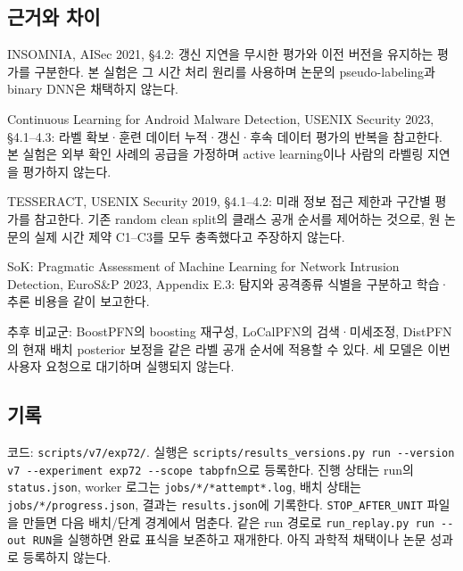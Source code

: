 \subsection{근거와 차이}
\par\noindent \textbullet\enspace INSOMNIA, AISec 2021, §4.2: 갱신 지연을 무시한 평가와 이전 버전을 유지하는 평가를 구분한다. 본 실험은 그 시간 처리 원리를 사용하며 논문의 pseudo-labeling과 binary DNN은 채택하지 않는다.


\par\noindent \textbullet\enspace Continuous Learning for Android Malware Detection, USENIX Security 2023, §4.1–4.3: 라벨 확보·훈련 데이터 누적·갱신·후속 데이터 평가의 반복을 참고한다. 본 실험은 외부 확인 사례의 공급을 가정하며 active learning이나 사람의 라벨링 지연을 평가하지 않는다.


\par\noindent \textbullet\enspace TESSERACT, USENIX Security 2019, §4.1–4.2: 미래 정보 접근 제한과 구간별 평가를 참고한다. 기존 random clean split의 클래스 공개 순서를 제어하는 것으로, 원 논문의 실제 시간 제약 C1–C3를 모두 충족했다고 주장하지 않는다.


\par\noindent \textbullet\enspace SoK: Pragmatic Assessment of Machine Learning for Network Intrusion Detection, EuroS\&P 2023, Appendix E.3: 탐지와 공격종류 식별을 구분하고 학습·추론 비용을 같이 보고한다.


\par\noindent \textbullet\enspace 추후 비교군: BoostPFN의 boosting 재구성, LoCalPFN의 검색·미세조정, DistPFN의 현재 배치 posterior 보정을 같은 라벨 공개 순서에 적용할 수 있다. 세 모델은 이번 사용자 요청으로 대기하며 실행되지 않는다.


\subsection{기록}
코드: \texttt{scripts/\allowbreak{}\allowbreak{}v7/\allowbreak{}\allowbreak{}exp72\allowbreak{}/\allowbreak{}\allowbreak{}}. 실행은 \texttt{scripts/\allowbreak{}\allowbreak{}results\_\allowbreak{}\allowbreak{}versions\allowbreak{}.\allowbreak{}py run \allowbreak{}-\allowbreak{}-\allowbreak{}versio\allowbreak{}n v7 -\allowbreak{}-\allowbreak{}e\allowbreak{}xperimen\allowbreak{}t exp72 \allowbreak{}-\allowbreak{}-\allowbreak{}scope \allowbreak{}tabpfn}으로 등록한다. 진행 상태는 run의 \texttt{status.\allowbreak{}j\allowbreak{}son}, worker 로그는 \texttt{jobs/\allowbreak{}\allowbreak{}*/\allowbreak{}\allowbreak{}*\allowbreak{}attempt*\allowbreak{}.\allowbreak{}log}, 배치 상태는 \texttt{jobs/\allowbreak{}\allowbreak{}*/\allowbreak{}\allowbreak{}p\allowbreak{}rogress.\allowbreak{}json}, 결과는 \texttt{results.\allowbreak{}json}에 기록한다. \texttt{STOP\_\allowbreak{}\allowbreak{}AFT\allowbreak{}ER\_\allowbreak{}\allowbreak{}UNIT} 파일을 만들면 다음 배치/\allowbreak{}단계 경계에서 멈춘다. 같은 run 경로로 \texttt{run\_\allowbreak{}\allowbreak{}repl\allowbreak{}ay.\allowbreak{}py ru\allowbreak{}n -\allowbreak{}-\allowbreak{}out \allowbreak{}RUN}을 실행하면 완료 표식을 보존하고 재개한다. 아직 과학적 채택이나 논문 성과로 등록하지 않는다.



